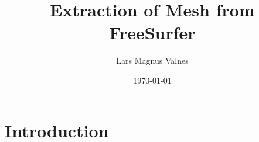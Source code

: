 \documentclass{beamer}
\title[FreeSurfer]{Extraction of Mesh from FreeSurfer} %
\author{Lars Magnus Valnes} %
\institute[UiO] %
{
University of Oslo \\ %
}
\date{\today} %
\begin{document}
\begin{frame}
\titlepage %
\end{frame}


\section{Introduction}


\end{document}
